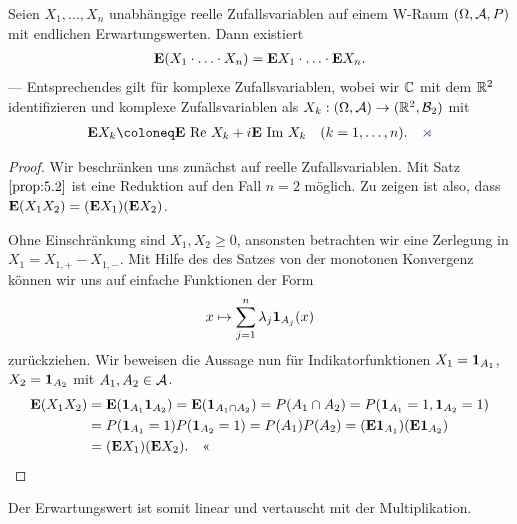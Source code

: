 \begin{prop}
\label{prop:5.4}
Seien $X_{1},\ldots, X_{n}$ unabhängige reelle Zufallsvariablen auf einem
W-Raum $(\Omega, \AA,P)$ mit endlichen Erwartungswerten. Dann existiert
\begin{align*}
\E(X_{1}\cdot \ldots\cdot X_{n})= \E X_{1} \cdot \ldots \cdot \E X_{n}.
\end{align*}
--- Entsprechendes gilt für komplexe Zufallsvariablen, wobei wir $\C$ mit dem
$\R^2$ identifizieren und komplexe Zufallsvariablen als $X_{k}:(\Omega,
\AA)\to (\R^ {2}, {\cal B}_{2})$ mit
\begin{align*}
\E X_{k}\defl \E \mbox{ Re } X_{k}+i\E\mbox{ Im } X_{k} \quad
(k=1,\ldots,n).\fishhere
\end{align*}
\end{prop}
\begin{proof}
Wir beschränken uns zunächst auf reelle Zufallsvariablen. Mit Satz
$\ref{prop:5.2}$ ist eine Reduktion auf den Fall $n=2$ möglich. Zu zeigen ist
also, dass $\E (X_1 X_2) = (\E X_1)(\E X_2)$.

Ohne Einschränkung sind $X_1,X_2\ge 0$, ansonsten betrachten wir eine Zerlegung
in $X_1=X_{1,+}-X_{1,-}$. Mit Hilfe des des Satzes von der monotonen
Konvergenz können wir uns auf einfache Funktionen der Form
\begin{align*}
x\mapsto  \sum\limits_{j=1}^n \lambda_j \Id_{A_j}(x)
\end{align*}
zurückziehen. Wir beweisen die Aussage nun für Indikatorfunktionen $X_1 =
\Id_{A_1}$, $X_2=\Id_{A_2}$ mit $A_1,A_2\in\AA$.
\begin{align*}
\E (X_1 X_2) &= \E(\Id_{A_1}\Id_{A_2}) = \E (\Id_{A_1\cap A_2}) = P(A_1\cap
A_2) = P(\Id_{A_1}=1, \Id_{A_2}=1)\\ & = P(\Id_{A_1}=1)P(\Id_{A_2}=1)
= P(A_1)P(A_2)  = (\E \Id_{A_1})(\E \Id_{A_2}) \\ &= (\E X_1)(\E X_2).\qedhere  
\end{align*}
\end{proof}

Der Erwartungswert ist somit linear und vertauscht mit der Multiplikation.

